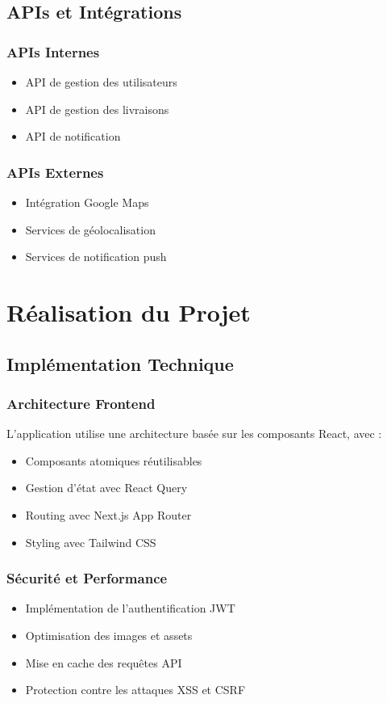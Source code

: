\documentclass[12pt,a4paper]{report}
\begin{document}
\section{APIs et Intégrations}
\subsection{APIs Internes}
\begin{itemize}
    \item API de gestion des utilisateurs
    \item API de gestion des livraisons
    \item API de notification
\end{itemize}

\subsection{APIs Externes}
\begin{itemize}
    \item Intégration Google Maps
    \item Services de géolocalisation
    \item Services de notification push
\end{itemize}

\chapter{Réalisation du Projet}
\section{Implémentation Technique}
\subsection{Architecture Frontend}
L'application utilise une architecture basée sur les composants React, avec :
\begin{itemize}
    \item Composants atomiques réutilisables
    \item Gestion d'état avec React Query
    \item Routing avec Next.js App Router
    \item Styling avec Tailwind CSS
\end{itemize}

\subsection{Sécurité et Performance}
\begin{itemize}
    \item Implémentation de l'authentification JWT
    \item Optimisation des images et assets
    \item Mise en cache des requêtes API
    \item Protection contre les attaques XSS et CSRF
\end{itemize}
\end{document}
